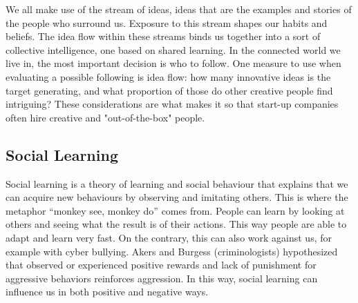 \documentclass{article}
\begin{document}
We all make use of the stream of ideas, ideas that are the examples and stories of the people who surround us. Exposure to this stream shapes our habits and beliefs. The idea flow within these streams binds us together into a sort of collective intelligence, one based on shared learning. In the connected world we live in, the most important decision is who to follow. One measure to use when evaluating a possible following is idea flow: how many innovative ideas is the target generating, and what proportion of those do other creative people find intriguing? These considerations are what makes it so that start-up companies often hire creative and "out-of-the-box" people.

\subsection{Social Learning}
Social learning is a theory of learning and social behaviour that explains that we can acquire new behaviours by observing and imitating others. This is where the metaphor ``monkey see, monkey do'' comes from. People can learn by looking at others and seeing what the result is of their actions. This way people are able to adapt and learn very fast. On the contrary, this can also work against us, for example with cyber bullying. Akers and Burgess (criminologists) hypothesized that observed or experienced positive rewards and lack of punishment for aggressive behaviors reinforces aggression. In this way, social learning can influence us in both positive and negative ways.
\end{document}
